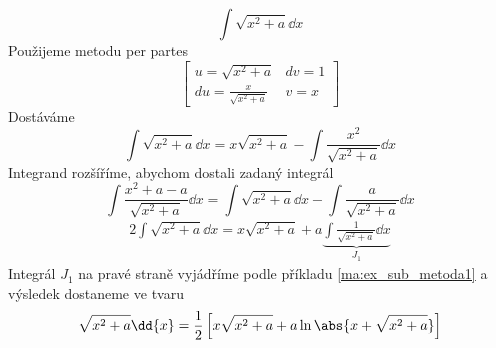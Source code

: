 \begin{mdframed}[style=mdexam]
  \begin{example}\label{mai:exam114}
    \begin{equation}\label{mai:exam016_003}
      \boxed{\int\sqrt{x^2+a}\dd{x}}
    \end{equation}  
    Použijeme metodu per partes
    \begin{equation*}
      \left[
        \begin{array}{cc} 
           u =\sqrt{x^2+a}              & dv = 1 \\ 
          du =\displaystyle
                \frac{x}{\sqrt{x^2+a}}  &  v = x
        \end{array}
      \right]   
    \end{equation*}
    Dostáváme
    \begin{equation*}
      \int{\sqrt{x^2+a}\dd{x}} = x\sqrt{x^2+a}-\int{\frac{x^2}{\sqrt{x^2+a}}\dd{x}}
    \end{equation*}
    Integrand rozšíříme, abychom dostali zadaný integrál 
    \begin{equation*}
        \int\frac{x^2+a-a}{\sqrt{x^2+a}}\dd{x} 
          = \int{\sqrt{x^2+a}\dd{x}} - \int{\frac{a}{\sqrt{x^2+a}}\dd{x}}                   
    \end{equation*}
    \begin{align*}
      2\!\int{\sqrt{x^2+a}\dd{x}} 
        = x\sqrt{x^2+a}+a\underbrace{\int{\frac{1}{\sqrt{x^2+a}}}\dd{x}}_{J_1}
    \end{align*}    
    Integrál \(J_1\) na pravé straně vyjádříme podle příkladu \ref{ma:ex_sub_metoda1} a výsledek
    do\-sta\-ne\-me ve tvaru
    \begin{gather*}
      \sqrt{x^2+a}\dd{x}
          =\frac{1}{2}\left[x\sqrt{x^2+a}+a\ln{\abs{x + \sqrt{x^2+a}}}\right]
    \end{gather*}
  \end{example}
\end{mdframed}